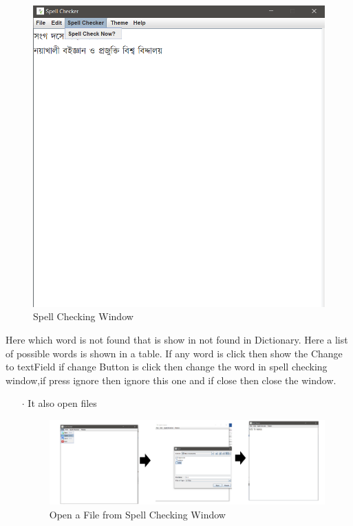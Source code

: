 \documentclass[12pt,letterpaper]{article}
\begin{document}
\begin{flushleft}
\begin{figure}[h]
    \centering
    \includegraphics[scale=0.8]{spell.png}
    \caption{Spell Checking Window}
    \label{fig:myfigure}
\end{figure}
Here which word is not found that is show in not found in Dictionary. Here a list of possible words is 
shown in a table. If any word is click then show the Change to textField if change Button is click then 
change the word in spell checking window,if press ignore then ignore this one and if close then close 
the window. \\
\begin{itemize}
  \item[$\cdot$] 
  It also open files
\begin{figure}[htbp]
    \centering
    \includegraphics[scale=0.8]{open.png}
    \caption{Open a File from Spell Checking Window}
    \label{fig:myfigure}

\end{figure}
\end{itemize}
\end{flushleft}
\end{document}
